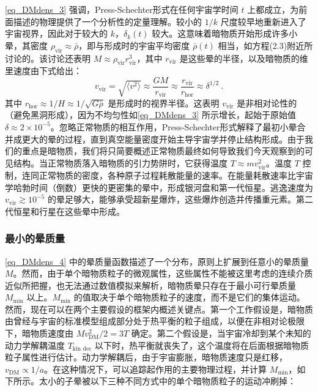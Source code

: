 \autoref{eq_DMdens_3} 强调，Press-Schechter形式在任何宇宙学时间 \( t \) 上都成立，为前面描述的物理提供了一个分析性的定量理解。较小的 \( 1/k \) 尺度较早地重新进入了宇宙视界，因此对于较大的 \( k \)，\( \delta_k(t) \) 较大。这意味着暗物质开始形成许多小晕，其密度 \( \rho_{\text{vir}} \approx \bar{\rho} \)，即与形成时的宇宙平均密度 \( \bar{\rho}(t) \) 相当，如方程(2.3)附近所讨论的。该讨论还表明 \( M \approx \rho_{\text{vir}} r_{\text{vir}}^3 \)，其中 \( r_{\text{vir}} \) 是这些晕的半径，以及暗物质的维里速度由下式给出：
\begin{equation}
v_{\text{vir}} = \sqrt{\langle v^2 \rangle} \approx \frac{GM}{r_{\text{vir}}} \approx \frac{r_{\text{vir}}}{r_{\text{hor}}} \approx \delta^{1/2}~. 
\end{equation}
其中 \( r_{\text{hor}} \approx 1/H \approx 1/\sqrt{G\bar{\rho}} \) 是形成时的视界半径。这表明 \( v_{\text{vir}} \) 是非相对论性的（避免黑洞形成），因为不均匀性如\autoref{eq_DMdens_3} 所示增长，起始于原始值 \( \delta \approx 2 \times 10^{-5} \)。忽略正常物质的相互作用，Press-Schechter形式解释了最初小晕合并成更大的晕的过程，直到真空能量密度开始主导宇宙学并停止结构形成。由于我们的重点是暗物质，我们将只简要概述正常物质最终如何导致我们今天观察到的可见结构。当正常物质落入暗物质的引力势阱时，它获得温度 \( T \approx m v_{\text{vir}}^2 \)。温度 \( T \) 控制，连同正常物质的密度，各种原子过程耗散能量的速率。在能量耗散速率比宇宙学哈勃时间（倒数）更快的更密集的晕中，形成银河盘和第一代恒星。逃逸速度为 \( v_{\text{vir}} \gtrsim 10^{-5} \) 的晕足够大，能够承受超新星爆炸，这些爆炸创造并传播重元素。第二代恒星和行星在这些晕中形成。

\subsubsection{最小的晕质量}

\autoref{eq_DMdens_4} 中的晕质量函数描述了一个分布，原则上扩展到任意小的晕质量 \( M \)。然而，由于单个暗物质粒子的微观属性，这些属性不能被这里考虑的连续介质近似所把握，也无法通过数值模拟来解析，暗物质晕只存在于最小可行晕质量 \( M_{\text{min}} \) 以上。\( M_{\text{min}} \) 的值取决于单个暗物质粒子的速度，而不是它们的集体运动。然而，现在可以在两个主要假设的框架内概述关键点。第一个工作假设是，暗物质由曾经与宇宙的标准模型组成部分处于热平衡的粒子组成，以便在非相对论极限下，暗物质速度由 \( M v_{\text{DM}}^2/2 = 3T \) 确定。第二个假设是，当宇宙冷却到某个未知的动力学解耦温度 \( T_{\text{kin dec}} \) 以下时，热平衡就丧失了，这个温度将在后面根据暗物质粒子属性进行估计。动力学解耦后，由于宇宙膨胀，暗物质速度只是红移，\( v_{\text{DM}} \propto 1/a \)。在这种情况下，可以追踪起作用的主要物理过程，并计算 \( M_{\text{min}} \)，如下所示。太小的子晕被以下三种不同方式中的单个暗物质粒子的运动冲刷掉：

